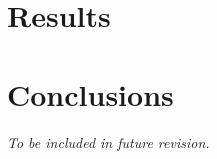 \documentclass[11pt,a4paper]{article}\usepackage[]{graphicx}\usepackage[]{color}
\begin{document}

\section{Results}\label{sec:results}


\section{Conclusions}\label{sec:conclusions}

\textit{To be included in future revision.}

\printbibliography
\end{document}
